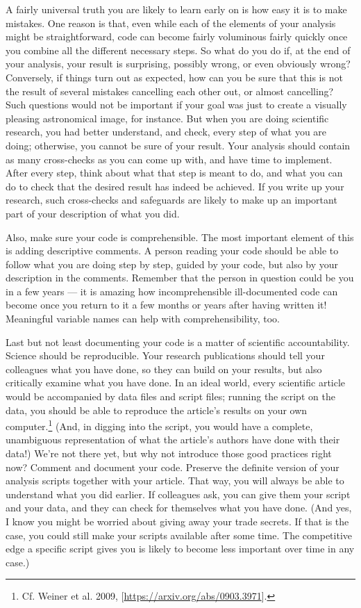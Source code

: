 \documentclass[twocolumn,apj]{openjournal}
\begin{document}
A fairly universal truth you are likely to learn early on is how easy it is to make mistakes. One reason is that, even while each of the elements of your analysis might be straightforward, code can become fairly voluminous fairly quickly once you combine all the different necessary steps. So what do you do if, at the end of your analysis, your result is surprising, possibly wrong, or even obviously wrong? Conversely, if things turn out as expected, how can you be sure that this is not the result of several mistakes cancelling each other out, or almost cancelling? Such questions would not be important if your goal was just to create a visually pleasing astronomical image, for instance. But when you are doing scientific research, you had better understand, and check, every step of what you are doing; otherwise, you cannot be sure of your result. Your analysis should contain as many cross-checks as you can come up with, and have time to implement. After every step, think about what that step is meant to do, and what you can do to check that the desired result has indeed be achieved. If you write up your research, such cross-checks and safeguards are likely to make up an important part of your description of what you did.

Also, make sure your code is comprehensible. The most important element of this is adding descriptive comments. A person reading your code should be able to follow what you are doing step by step, guided by your code, but also by your description in the comments. Remember that the person in question could be you in a few years --- it is amazing how incomprehensible ill-documented code can become once you return to it a few months or years after having written it! Meaningful variable names can help with comprehensibility, too.

Last but not least documenting your code is a matter of scientific accountability. Science should be reproducible. Your research publications should tell your colleagues what you have done, so they can build on your results, but also critically examine what you have done. In an ideal world, every scientific article would be accompanied by data files and script files; running the script on the data, you should be able to reproduce the article's results on your own computer.\footnote{Cf. Weiner et al. 2009, [\href{https://arxiv.org/abs/0903.3971}{https://arxiv.org/abs/0903.3971}].} (And, in digging into the script, you would have a complete, unambiguous representation of what the article's authors have done with their data!) We're not there yet, but why not introduce those good practices right now? Comment and document your code. Preserve the definite version of your analysis scripts together with your article. That way, you will always be able to understand what you did earlier. If colleagues ask, you can give them your script and your data, and they can check for themselves what you have done. (And yes, I know you might be worried about giving away your trade secrets. If that is the case, you could still make your scripts available after some time. The competitive edge a specific script gives you is likely to become less important over time in any case.)
\end{document}
